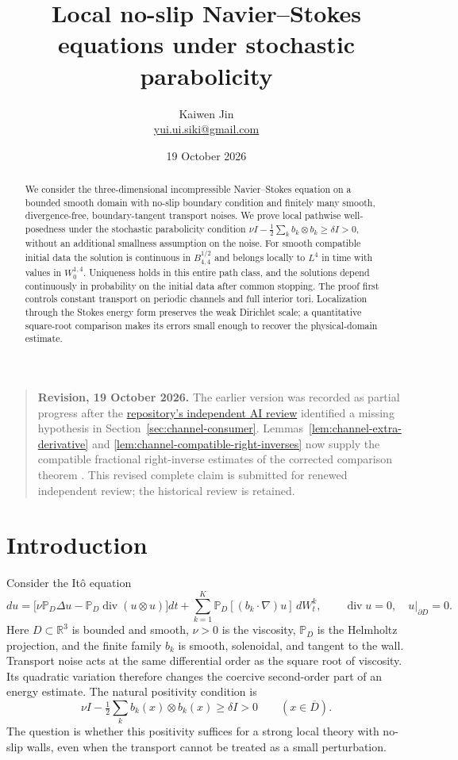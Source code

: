 \documentclass[11pt]{article}
\title{Local no-slip Navier--Stokes equations under stochastic parabolicity}
\author{Kaiwen Jin\\\small\href{mailto:yui.ui.siki@gmail.com}{yui.ui.siki@gmail.com}}
\date{19 October 2026}
\numberwithin{equation}{section}
\theoremstyle{remark}
\newcommand{\R}{\mathbb R}
\newcommand{\PP}{\mathbb P}
\newcommand{\divg}{\operatorname{div}}
\begin{document}
\maketitle

\begin{quote}\small
\textbf{Revision, 19 October 2026.}
The earlier version was recorded as partial progress after the
\href{https://github.com/MColbrook/AIM/blob/24edaadc6bb272737d8da0745c662c992db07b22/research/solution_reviews/2026-10-15-active-prs/458-review.md}{repository's independent AI review}
identified a missing hypothesis in Section~\ref{sec:channel-consumer}.
Lemmas~\ref{lem:channel-extra-derivative} and
\ref{lem:channel-compatible-right-inverses} now supply the compatible
fractional right-inverse estimates of the corrected comparison theorem
\cite[Theorem 1.3]{KWErratum}. This revised complete claim is submitted
for renewed independent review; the historical review is retained.
\end{quote}

\begin{abstract}
We consider the three-dimensional incompressible Navier--Stokes equation
on a bounded smooth domain with no-slip boundary condition and finitely
many smooth, divergence-free, boundary-tangent transport noises. We prove
local pathwise well-posedness under the stochastic parabolicity condition
$\nu I-\frac12\sum_k b_k\otimes b_k\geq\delta I>0$, without an
additional smallness assumption on the noise. For smooth compatible
initial data the solution is continuous in $B^{1/2}_{4,4}$ and belongs
locally to $L^4$ in time with values in $W^{1,4}_0$. Uniqueness holds
in this entire path class, and the solutions depend continuously in
probability on the initial data after common stopping. The proof first
controls constant transport on periodic channels and full interior
tori. Localization through the Stokes energy form preserves the weak
Dirichlet scale; a quantitative square-root comparison makes its errors
small enough to recover the physical-domain estimate.
\end{abstract}

\section{Introduction}\label{sec:intro}

Consider the It\^o equation
\begin{equation}\label{eq:NS}
 du=\bigl[\nu\PP_D\Delta u-\PP_D\divg(u\otimes u)\bigr]dt
 +\sum_{k=1}^K\PP_D[(b_k\cdot\nabla)u]\,dW^k_t,
 \qquad \divg u=0,\quad u|_{\partial D}=0.
\end{equation}
Here $D\subset\R^3$ is bounded and smooth, $\nu>0$ is the viscosity,
$\PP_D$ is the Helmholtz projection, and the finite family $b_k$ is
smooth, solenoidal, and tangent to the wall. Transport noise acts at
the same differential order as the square root of viscosity. Its
quadratic variation therefore changes the coercive second-order part
of an energy estimate. The natural positivity condition is
\[
 \nu I-\tfrac12\sum_kb_k(x)\otimes b_k(x)\geq\delta I>0
 \qquad(x\in\overline D).
\]
The question is whether this positivity suffices for a strong local
theory with no-slip walls, even when the transport cannot be treated
as a small perturbation.
\end{document}

